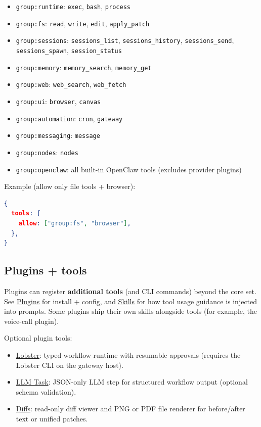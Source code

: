 \begin{itemize}
  \item \texttt{group:runtime}: \texttt{exec}, \texttt{bash}, \texttt{process}
  \item \texttt{group:fs}: \texttt{read}, \texttt{write}, \texttt{edit}, \texttt{apply\_patch}
  \item \texttt{group:sessions}: \texttt{sessions\_list}, \texttt{sessions\_history}, \texttt{sessions\_send}, \texttt{sessions\_spawn}, \texttt{session\_status}
  \item \texttt{group:memory}: \texttt{memory\_search}, \texttt{memory\_get}
  \item \texttt{group:web}: \texttt{web\_search}, \texttt{web\_fetch}
  \item \texttt{group:ui}: \texttt{browser}, \texttt{canvas}
  \item \texttt{group:automation}: \texttt{cron}, \texttt{gateway}
  \item \texttt{group:messaging}: \texttt{message}
  \item \texttt{group:nodes}: \texttt{nodes}
  \item \texttt{group:openclaw}: all built-in OpenClaw tools (excludes provider plugins)
\end{itemize}


Example (allow only file tools + browser):

\begin{lstlisting}[language=json]
{
  tools: {
    allow: ["group:fs", "browser"],
  },
}
\end{lstlisting}


\subsection{Plugins + tools}


Plugins can register \textbf{additional tools} (and CLI commands) beyond the core set.
See \href{/tools/plugin}{Plugins} for install + config, and \href{/tools/skills}{Skills} for how
tool usage guidance is injected into prompts. Some plugins ship their own skills
alongside tools (for example, the voice-call plugin).

Optional plugin tools:

\begin{itemize}
  \item \href{/tools/lobster}{Lobster}: typed workflow runtime with resumable approvals (requires the Lobster CLI on the gateway host).
  \item \href{/tools/llm-task}{LLM Task}: JSON-only LLM step for structured workflow output (optional schema validation).
  \item \href{/tools/diffs}{Diffs}: read-only diff viewer and PNG or PDF file renderer for before/after text or unified patches.
\end{itemize}


